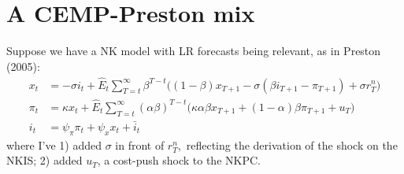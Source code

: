 \documentclass[11pt]{article}
\renewcommand{\[}{\begin{equation}}
\renewcommand{\]}{\end{equation}}
\begin{document}
\section{A CEMP-Preston mix}

Suppose we have a NK model with LR forecasts being relevant, as in Preston (2005):
\begin{align}
x_t &=  -\sigma i_t +\hat{E}_t \sum_{T=t}^{\infty} \beta^{T-t }\big( (1-\beta)x_{T+1} - \sigma(\beta i_{T+1} - \pi_{T+1}) +\sigma r_T^n \big) \tag{Preston, eq. (18)} \\
\pi_t &= \kappa x_t +\hat{E}_t \sum_{T=t}^{\infty} (\alpha\beta)^{T-t }\big( \kappa \alpha \beta x_{T+1} + (1-\alpha)\beta \pi_{T+1} + u_T\big)\tag{Preston, eq. (19)} \\
i_t &= \psi_{\pi}\pi_t + \psi_{x} x_t + \bar{i}_t \tag{Preston, eq. (27)} 
\end{align}
 where I've 1) added $\sigma$ in front of $r_T^n,$ reflecting the derivation of the shock on the NKIS; 2) added $u_T$, a cost-push shock to the NKPC. 
 
\end{document}
